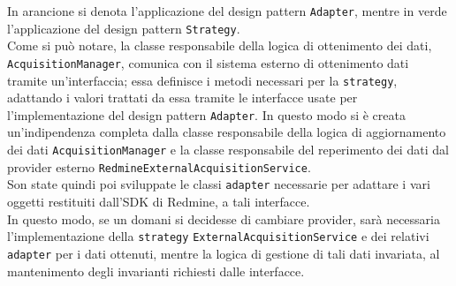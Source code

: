 			In arancione si denota l'applicazione del design pattern \texttt{Adapter}, mentre in verde l'applicazione del design pattern \texttt{Strategy}. \\
			Come si può notare, la classe responsabile della logica di ottenimento dei dati,\\ \texttt{AcquisitionManager}, comunica con il sistema esterno di ottenimento dati tramite un'interfaccia; essa definisce i metodi necessari per la \texttt{strategy}, adattando i valori trattati da essa tramite le interfacce usate per l'implementazione del design pattern \texttt{Adapter}. In questo modo si è creata un'indipendenza completa dalla classe responsabile della logica di aggiornamento dei dati \texttt{AcquisitionManager} e la classe responsabile del reperimento dei dati dal provider esterno \texttt{RedmineExternalAcquisitionService}.\\
			Son state quindi poi sviluppate  le classi \texttt{adapter} necessarie per adattare i vari oggetti restituiti dall'SDK di Redmine, a tali interfacce.\\
			In questo modo, se un domani si decidesse di cambiare provider, sarà necessaria l'implementazione della \texttt{strategy} \texttt{ExternalAcquisitionService} e dei relativi \texttt{adapter} per i dati ottenuti, mentre la logica di gestione di tali dati invariata, al mantenimento degli invarianti richiesti dalle interfacce.\\
